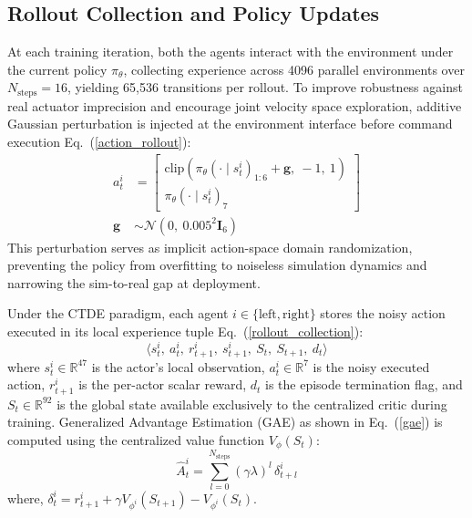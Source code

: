 \documentclass[lettersize,journal]{IEEEtran}
\begin{document}

\subsection{Rollout Collection and Policy Updates}
\label{rollout_collection_policy_updates}
At each training iteration, both the agents interact with the environment under the current policy $\pi_\theta$, collecting experience across 4096 parallel environments over $N_{\text{steps}} = 16$, yielding 65,536 transitions per rollout. To improve robustness against real actuator imprecision and encourage joint velocity space exploration, additive Gaussian perturbation is injected at the environment interface before command execution Eq.~(\ref{action_rollout}):
\begin{equation}
\begin{aligned}
a_t^i &=
\left[
\begin{array}{c}
\mathrm{clip}\left( \pi_{\theta}(\cdot \mid s_t^i)_{1:6} + \mathbf{g},\ -1,\ 1 \right) \\
\pi_{\theta}(\cdot \mid s_t^i)_{7}
\end{array}
\right] \\
\mathbf{g} &\sim \mathcal{N}\left(0,\ 0.005^2 \mathbf{I}_6\right)
\end{aligned}
\label{action_rollout}
\end{equation}
This perturbation serves as implicit action-space domain randomization, preventing the policy from overfitting to noiseless simulation dynamics and narrowing the sim-to-real gap at deployment.

Under the CTDE paradigm, each agent $i \in \{\text{left}, \text{right}\}$ stores the noisy action executed in its local experience tuple Eq.~(\ref{rollout_collection}):
\begin{equation}
\langle s_t^i,\ a_t^i,\ r_{t+1}^i,\ s_{t+1}^i,\ S_t,\ S_{t+1},\ d_t \rangle
\label{rollout_collection}
\end{equation}
where $s_t^i \in \mathbb{R}^{47}$ is the actor's local observation, $a_t^i \in \mathbb{R}^7$ is the noisy executed action, $r_{t+1}^i$ is the per-actor scalar reward, $d_t$ is the episode termination flag, and $S_t \in \mathbb{R}^{92}$ is the global state available exclusively to the centralized critic during training.
\noindent Generalized Advantage Estimation (GAE) as shown in Eq.~(\ref{gae}) is computed using the centralized value function $V_\phi(S_t)$:
\begin{equation}
\hat{A}^{i}_t = \sum_{l=0}^{N_{\text{steps}}} (\gamma \lambda)^l \, \delta^{i}_{t+l}
\label{gae}
\end{equation}
where, $\delta_t^i = r_{t+1}^i + \gamma V_{\phi^{i}}(S_{t+1}) - V_{\phi^{i}}(S_t)$.
\end{document}
